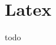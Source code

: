 \documentclass[FIPLY_base.tex]{subfiles}
\author{Gerald Irsiegler}
\date{26. Februar 2016}
\begin{document}
\section{Latex}
todo
\end{document}

